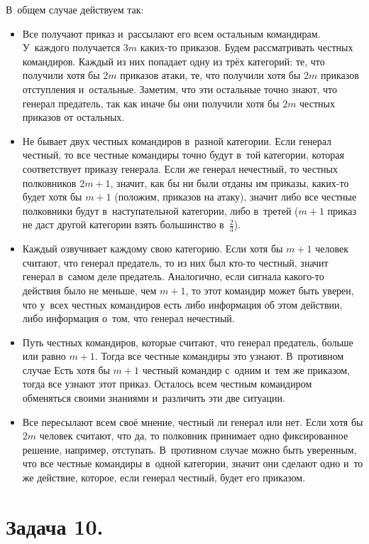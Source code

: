\documentclass{article}
\begin{document}
В~общем случае действуем так:
\begin{itemize}
	\item Все получают приказ и~рассылают его всем остальным командирам. У~каждого
		получается $3m$ каких-то приказов. Будем рассматривать честных командиров.
		Каждый из них попадает одну из трёх категорий: те, что получили хотя бы $2m$
		приказов атаки, те, что получили хотя	бы $2m$ приказов отступления
		и~остальные. Заметим, что эти остальные точно знают, что генерал предатель,
		так как иначе бы они получили хотя бы $2m$ честных приказов от остальных.
	\item Не бывает двух честных командиров в~разной категории. Если генерал
		честный, то все честные командиры точно будут в~той категории, которая
		соответствует приказу генерала. Если же генерал нечестный, то честных
		полковников $2m+1$, значит, как бы ни были отданы им приказы, каких-то будет
		хотя бы $m+1$ (положим, приказов на атаку), значит либо все честные
		полковники будут в~наступательной категории, либо в~третей ($m+1$ приказ не
		даст другой категории взять большинство в~$\frac{2}{3}$).
	\item Каждый озвучивает каждому свою категорию. Если хотя бы $m+1$ человек
		считают, что генерал предатель, то из них был кто-то честный, значит
		генерал в~самом деле предатель. Аналогично, если сигнала какого-то действия
		было не меньше, чем $m+1$, то этот командир может быть уверен, что у~всех
		честных командиров есть либо информация об этом действии, либо информация
		о~том, что генерал нечестный.
	\item Путь честных командиров, которые считают, что генерал предатель, больше
		или равно $m+1$. Тогда все честные командиры это узнают. В~противном случае
		Есть хотя бы $m+1$ честный командир с~одним и~тем же приказом, тогда все
		узнают этот приказ. Осталось всем честным командиром обменяться своими
		знаниями и~различить эти две ситуации.
	\item Все пересылают всем своё мнение, честный ли генерал или нет. Если хотя
		бы $2m$ человек считают, что да, то полковник принимает одно фиксированное
		решение, например, отступать.
		В~противном случае можно быть уверенным, что все честные командиры в~одной
		категории, значит они сделают одно и~то же действие, которое, если генерал
		честный, будет его приказом.
\end{itemize}

\section*{Задача 10.}
\end{document}
